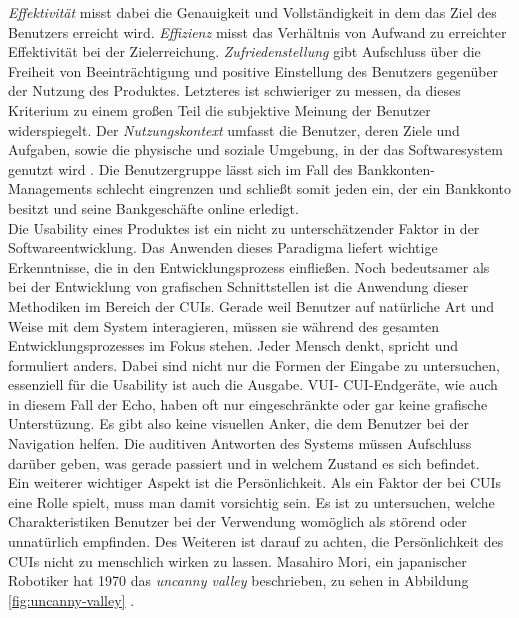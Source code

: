 \textit{Effektivität} misst dabei die Genauigkeit und Vollständigkeit in dem das Ziel des Benutzers erreicht wird. \textit{Effizienz} misst das Verhältnis von Aufwand zu erreichter Effektivität bei der Zielerreichung. \textit{Zufriedenstellung} gibt Aufschluss über die Freiheit von Beeinträchtigung und positive Einstellung des Benutzers gegenüber der Nutzung des Produktes. Letzteres ist schwieriger zu messen, da dieses Kriterium zu einem großen Teil die subjektive Meinung der Benutzer widerspiegelt. Der \textit{Nutzungskontext} umfasst die Benutzer, deren Ziele und Aufgaben, sowie die physische und soziale Umgebung, in der das Softwaresystem genutzt wird \cite{richter-ux-compact}. Die Benutzergruppe lässt sich im Fall des Bankkonten-Managements schlecht eingrenzen und schließt somit jeden ein, der ein Bankkonto besitzt und seine Bankgeschäfte online erledigt.\\
Die Usability eines Produktes ist ein nicht zu unterschätzender Faktor in der Softwareentwicklung. Das Anwenden dieses Paradigma liefert wichtige Erkenntnisse, die in den Entwicklungsprozess einfließen. Noch bedeutsamer als bei der Entwicklung von grafischen Schnittstellen ist die Anwendung dieser Methodiken im Bereich der CUIs. Gerade weil Benutzer auf natürliche Art und Weise mit dem System interagieren, müssen sie während des gesamten Entwicklungsprozesses im Fokus stehen. Jeder Mensch denkt, spricht und formuliert anders. Dabei sind nicht nur die Formen der Eingabe zu untersuchen, essenziell für die Usability ist auch die Ausgabe. \ac{VUI}- \bzw \ac{CUI}-Endgeräte, wie auch in diesem Fall der Echo, haben oft nur eingeschränkte oder gar keine grafische Unterstüzung. Es gibt also keine visuellen Anker, die dem Benutzer bei der Navigation helfen. Die auditiven Antworten des Systems müssen Aufschluss darüber geben, was gerade passiert und in welchem Zustand es sich befindet.\\ 
Ein weiterer wichtiger Aspekt ist die Persönlichkeit. Als ein Faktor der bei \acp{CUI} eine Rolle spielt, muss man damit vorsichtig sein. Es ist zu untersuchen, welche Charakteristiken Benutzer bei der Verwendung  womöglich als störend oder unnatürlich empfinden. Des Weiteren ist darauf zu achten, die Persönlichkeit des \acp{CUI} nicht zu menschlich wirken zu lassen. Masahiro Mori, ein japanischer Robotiker hat 1970 das \textit{uncanny valley} beschrieben, zu sehen in Abbildung \ref{fig:uncanny-valley} \cite{watson-uncanney-valley}. 

